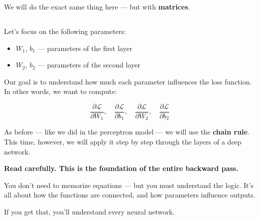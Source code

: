 \documentclass[11pt]{article}
\begin{document}
\vspace{1em}

\begin{tcolorbox}[colback=blue!5, colframe=blue!80!black, title=Now We Scale Up]
We will do the exact same thing here — but with \textbf{matrices}.
\end{tcolorbox}

\vspace{1em}
\subsection*{}

Let’s focus on the following parameters:

\begin{itemize}
  \item $W_1$, $b_1$ — parameters of the first layer
  \item $W_2$, $b_2$ — parameters of the second layer
\end{itemize}

Our goal is to understand how much each parameter influences the loss function.  
In other words, we want to compute:

\[
\frac{\partial \mathcal{L}}{\partial W_1}, \quad
\frac{\partial \mathcal{L}}{\partial b_1}, \quad
\frac{\partial \mathcal{L}}{\partial W_2}, \quad
\frac{\partial \mathcal{L}}{\partial b_2}
\]

As before — like we did in the perceptron model — we will use the \textbf{chain rule}.  
This time, however, we will apply it step by step through the layers of a deep network.

\vspace{1em}

\begin{tcolorbox}[colback=yellow!5, colframe=yellow!50!black, title=Before We Start]
\textbf{Read carefully. This is the foundation of the entire backward pass.}

You don’t need to memorize equations — but you must understand the logic.  
It’s all about how the functions are connected, and how parameters influence outputs.

If you get that, you’ll understand every neural network.
\end{tcolorbox}

\vspace{1.5em}

\subsection*{}
\end{document}
